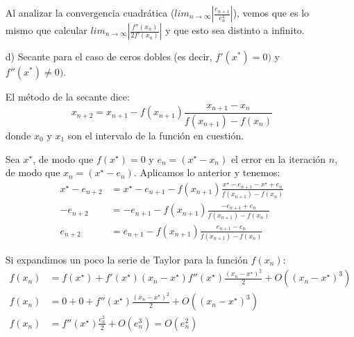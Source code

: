 \documentclass[spanish, fleqn]{article}
\newcommand{\xstar}{x^\star}
\begin{document}
\begin{enumerate}
    Al analizar la convergencia cuadrática ($lim_{n\rightarrow\infty} \left| \frac{e_{n+1}}{e_n^2} \right| $), vemos que es lo mismo que calcular $lim_{n\rightarrow\infty} \left| \frac{f''(x_n)}{2f'(x_n)} \right| $ y que esto sea distinto a infinito.
    
    \item[d)] Secante para el caso de ceros dobles (es decir, $f'(x^*) = 0)$ y $f''(x^*)\neq 0)$.
    
    El método de la secante dice:
    \begin{equation*}
        x_{n+2} = x_{n+1} - f(x_{n+1})\frac{x_{n+1} - x_{n}}{f(x_{n+1}) - f(x_n)}
    \end{equation*}
    donde $x_0$ y $x_1$ son el intervalo de la función en cuestión.
    
    Sea $x^\star$, de modo que $f(x^\star) = 0$ y $e_n = (x^\star - x_n)$ el error en la iteración $n$, de modo que $x_n = (x^\star - e_n)$. Aplicamos lo anterior y tenemos:
    \begin{align*}
        x^\star - e_{n+2} &= x^\star - e_{n+1} - f(x_{n+1})\frac{x^\star - e_{n+1} - x^\star + e_{n}}{f(x_{n+1}) - f(x_n)} \\
        - e_{n+2} &= - e_{n+1} - f(x_{n+1})\frac{ - e_{n+1} + e_{n}}{f(x_{n+1}) - f(x_n)}  \\
        e_{n+2} &= e_{n+1} - f(x_{n+1})\frac{e_{n+1} - e_{n}}{f(x_{n+1}) - f(x_n)} 
    \end{align*}
    
    Si expandimos un poco la serie de Taylor para la función $f(x_n)$:
    \begin{align*}
        f(x_n) &= f(\xstar) + f'(\xstar)(x_n - \xstar)  f''(\xstar)\frac{(x_n - \xstar)^2}{2} + O((x_n - \xstar)^3) \\ 
        f(x_n) &= 0 + 0 +   f''(\xstar)\frac{(x_n - \xstar)^2}{2} + O((x_n - \xstar)^3) \\ 
        f(x_n) &= f''(\xstar)\frac{e_n^2}{2} + O(e_n^3) = O(e_n^2) \\ 
    \end{align*}
    

\end{enumerate}
\end{document}
